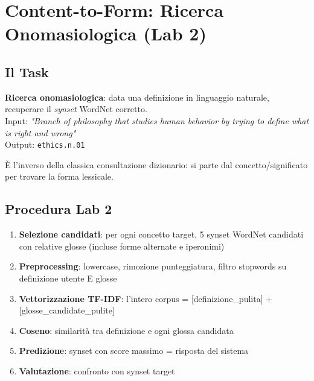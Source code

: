 \documentclass[12pt,a4paper]{article}
\begin{document}
\section{Content-to-Form: Ricerca Onomasiologica (Lab 2)}

\subsection{Il Task}

\begin{defbox}
\textbf{Ricerca onomasiologica}: data una definizione in linguaggio naturale, recuperare il \emph{synset} WordNet corretto.\\[4pt]
Input: \textit{"Branch of philosophy that studies human behavior by trying to define what is right and wrong"} \\
Output: \texttt{ethics.n.01}
\end{defbox}

\`E l'inverso della classica consultazione dizionario: si parte dal concetto/significato per trovare la forma lessicale.

\subsection{Procedura Lab 2}

\begin{enumerate}
  \item \textbf{Selezione candidati}: per ogni concetto target, 5 synset WordNet candidati con relative glosse (incluse forme alternate e iperonimi)
  \item \textbf{Preprocessing}: lowercase, rimozione punteggiatura, filtro stopwords su definizione utente E glosse
  \item \textbf{Vettorizzazione TF-IDF}: l'intero corpus = [definizione\_pulita] + [glosse\_candidate\_pulite]
  \item \textbf{Coseno}: similarit\`a tra definizione e ogni glossa candidata
  \item \textbf{Predizione}: synset con score massimo = risposta del sistema
  \item \textbf{Valutazione}: confronto con synset target
\end{enumerate}
\end{document}

